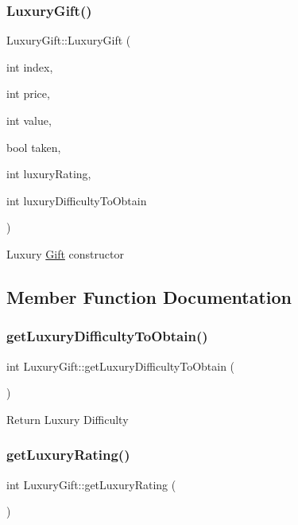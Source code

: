 \subsubsection{\texorpdfstring{Luxury\+Gift()}{LuxuryGift()}}
{\footnotesize\ttfamily Luxury\+Gift\+::\+Luxury\+Gift (\begin{DoxyParamCaption}\item[{int}]{index,  }\item[{int}]{price,  }\item[{int}]{value,  }\item[{bool}]{taken,  }\item[{int}]{luxury\+Rating,  }\item[{int}]{luxury\+Difficulty\+To\+Obtain }\end{DoxyParamCaption})}

Luxury \hyperlink{class_gift}{Gift} constructor 

\subsection{Member Function Documentation}
\mbox{\label{class_luxury_gift_a6441f2a7863c9079ce153721d3b6bce6}} 
\subsubsection{\texorpdfstring{get\+Luxury\+Difficulty\+To\+Obtain()}{getLuxuryDifficultyToObtain()}}
{\footnotesize\ttfamily int Luxury\+Gift\+::get\+Luxury\+Difficulty\+To\+Obtain (\begin{DoxyParamCaption}{ }\end{DoxyParamCaption})}

Return Luxury Difficulty \mbox{\label{class_luxury_gift_a7f1f89000bc9a5c2c88d525dc8f7f3c2}} 
\subsubsection{\texorpdfstring{get\+Luxury\+Rating()}{getLuxuryRating()}}
{\footnotesize\ttfamily int Luxury\+Gift\+::get\+Luxury\+Rating (\begin{DoxyParamCaption}{ }\end{DoxyParamCaption})}

